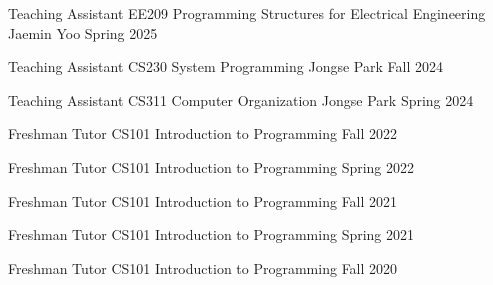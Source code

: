 \begin{cventries}

  \cventry
    {Teaching Assistant}
    {EE209 Programming Structures for Electrical Engineering}
    {Jaemin Yoo}
    {Spring 2025}
    {  }

  \cventry
    {Teaching Assistant}
    {CS230 System Programming}
    {Jongse Park}
    {Fall 2024}
    {  }

  \cventry
    {Teaching Assistant}
    {CS311 Computer Organization}
    {Jongse Park}
    {Spring 2024}
    {  }

  \cventry
    {Freshman Tutor}
    {CS101 Introduction to Programming}
    { }
    {Fall 2022}
    {  }

  \cventry
    {Freshman Tutor}
    {CS101 Introduction to Programming}
    { }
    {Spring 2022}
    {  }

  \cventry
    {Freshman Tutor}
    {CS101 Introduction to Programming}
    { }
    {Fall 2021}
    {  }

  \cventry
    {Freshman Tutor}
    {CS101 Introduction to Programming}
    { }
    {Spring 2021}
    {  }

  \cventry
    {Freshman Tutor}
    {CS101 Introduction to Programming}
    { }
    {Fall 2020}
    {  }
\end{cventries}
